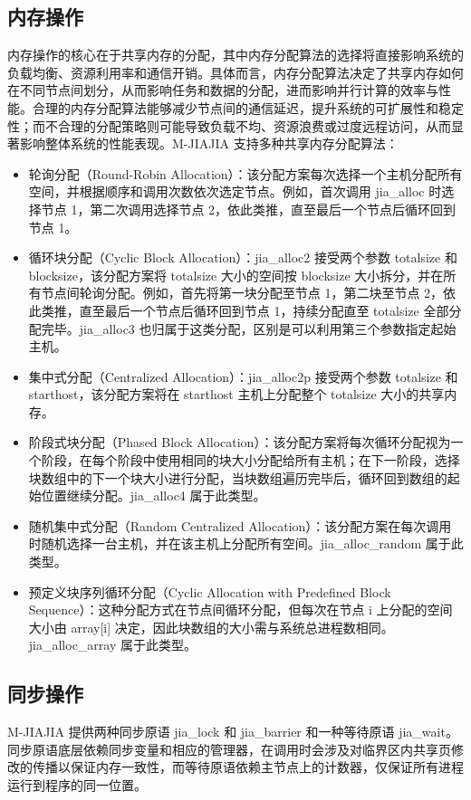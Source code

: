 {\subsection{内存操作}
内存操作的核心在于共享内存的分配，其中内存分配算法的选择将直接影响系统的负载均衡、资源利用率和通信开销。具体而言，内存分配算法决定了共享内存如何在不同节点间划分，从而影响任务和数据的分配，进而影响并行计算的效率与性能。合理的内存分配算法能够减少节点间的通信延迟，提升系统的可扩展性和稳定性；而不合理的分配策略则可能导致负载不均、资源浪费或过度远程访问，从而显著影响整体系统的性能表现。M-JIAJIA 支持多种共享内存分配算法：
\begin{itemize}
    \item 轮询分配（Round-Robin Allocation）：该分配方案每次选择一个主机分配所有空间，并根据顺序和调用次数依次选定节点。例如，首次调用 jia\_alloc 时选择节点 1，第二次调用选择节点 2，依此类推，直至最后一个节点后循环回到节点 1。
    \item 循环块分配（Cyclic Block Allocation）：jia\_alloc2 接受两个参数 totalsize 和 blocksize，该分配方案将 totalsize 大小的空间按 blocksize 大小拆分，并在所有节点间轮询分配。例如，首先将第一块分配至节点 1，第二块至节点 2，依此类推，直至最后一个节点后循环回到节点 1，持续分配直至 totalsize 全部分配完毕。jia\_alloc3 也归属于这类分配，区别是可以利用第三个参数指定起始主机。
    \item 集中式分配（Centralized Allocation）：jia\_alloc2p 接受两个参数 totalsize 和 starthost，该分配方案将在 starthost 主机上分配整个 totalsize 大小的共享内存。
    \item 阶段式块分配（Phased Block Allocation）：该分配方案将每次循环分配视为一个阶段，在每个阶段中使用相同的块大小分配给所有主机；在下一阶段，选择块数组中的下一个块大小进行分配，当块数组遍历完毕后，循环回到数组的起始位置继续分配。jia\_alloc4 属于此类型。
    \item 随机集中式分配（Random Centralized Allocation）：该分配方案在每次调用时随机选择一台主机，并在该主机上分配所有空间。jia\_alloc\_random 属于此类型。
    \item 预定义块序列循环分配（Cyclic Allocation with Predefined Block Sequence）：这种分配方式在节点间循环分配，但每次在节点 i 上分配的空间大小由 array[i] 决定，因此块数组的大小需与系统总进程数相同。jia\_alloc\_array 属于此类型。
\end{itemize}
\subsection{同步操作}
M-JIAJIA 提供两种同步原语 jia\_lock 和 jia\_barrier 和一种等待原语 jia\_wait。同步原语底层依赖同步变量和相应的管理器，在调用时会涉及对临界区内共享页修改的传播以保证内存一致性，而等待原语依赖主节点上的计数器，仅保证所有进程运行到程序的同一位置。

}

